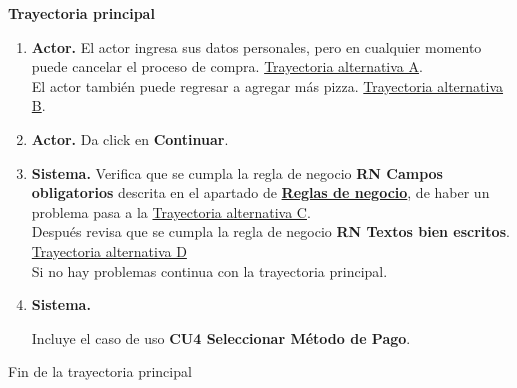 \noindent \textbf{Trayectoria principal}

\begin{enumerate}
	\item {\textbf{Actor.}} El actor ingresa sus datos personales, pero en cualquier momento puede cancelar el proceso de compra. \hyperlink{CU3:TAA}{Trayectoria alternativa A}.
	\\ El actor también puede regresar a agregar más pizza. \hyperlink{CU3:TAA}{Trayectoria alternativa B}.
	\\
	
	\item {\textbf{Actor.}} Da click en \textbf{Continuar}.
	
	\item \textbf{Sistema.} Verifica que se cumpla la regla de negocio \textbf{RN Campos obligatorios} descrita en el apartado de \hyperlink{RN}{\textbf{Reglas de negocio}}, de haber un problema pasa a la \hyperlink{CU3:TAC}{Trayectoria alternativa C}.
	\\Después revisa que se cumpla la regla de negocio \textbf{RN Textos bien escritos}. \hyperlink{CU3:TAD}{Trayectoria alternativa D}
	\\Si no hay problemas continua con la trayectoria principal.
	
	\item \hypertarget{CU3:TP:P4}{\textbf{Sistema.}} Incluye el caso de uso \textbf{CU4 Seleccionar Método de Pago}.
	
	
\end{enumerate}	
Fin de la trayectoria principal
\\

